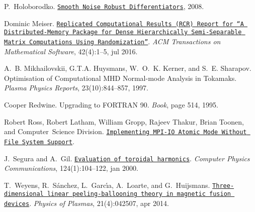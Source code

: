 \begin{DoxyDescription}
\item[\label{_CITEREF_holoborodko2008diff}%
\mbox{[}9\mbox{]}]P.~Holoborodko. \href{http://www.holoborodko.com/pavel/numerical-methods/numerical-derivative/smooth-low-noise-differentiators/}{\tt Smooth Noise Robust Differentiators}, 2008.


\item[\label{_CITEREF_Meiser2016}%
\mbox{[}10\mbox{]}]Dominic Meiser. \href{http://dl.acm.org/citation.cfm?doid=2956571.2929907}{\tt Replicated Computational Results (R\+CR) Report for “A Distributed-\/\+Memory Package for Dense Hierarchically Semi-\/\+Separable Matrix Computations Using Randomization”}. {\itshape A\+CM Transactions on Mathematical Software}, 42(4)\+:1--5, jul 2016. 


\item[\label{_CITEREF_mikhailovskii1997optimization}%
\mbox{[}11\mbox{]}]A.~B. Mikhailovskii, G.\+T.\+A. Huysmans, W.~O.~K. Kerner, and S.~E. Sharapov. Optimisation of Computational M\+HD Normal-\/mode Analysis in Tokamaks. {\itshape Plasma Physics Reports}, 23(10)\+:844--857, 1997.


\item[\label{_CITEREF_RedwineF90}%
\mbox{[}12\mbox{]}]Cooper Redwine. Upgrading to F\+O\+R\+T\+R\+AN 90. {\itshape Book}, page 514, 1995. 


\item[\label{_CITEREF_RossAtomicIO}%
\mbox{[}13\mbox{]}]Robert Ross, Robert Latham, William Gropp, Rajeev Thakur, Brian Toonen, and Computer~Science Division. \href{http://www.mcs.anl.gov/~thakur/papers/atomic-mode.pdf}{\tt Implementing M\+P\+I-\/\+IO Atomic Mode Without File System Support}.


\item[\label{_CITEREF_Segura2000}%
\mbox{[}14\mbox{]}]J.~Segura and A.~Gil. \href{http://linkinghub.elsevier.com/retrieve/pii/S0010465599004282
  https://ptp.jinr.ru/programs/cpc_ind8/ADKV.html
  http://cpc.cs.qub.ac.uk/summaries/ADKV_v1_0.html}{\tt Evaluation of toroidal harmonics}. {\itshape Computer Physics Communications}, 124(1)\+:104--122, jan 2000. 


\item[\label{_CITEREF_weyens2014theory}%
\mbox{[}15\mbox{]}]T.~Weyens, R.~S\'{a}nchez, L.~Garc\'{\i}a, A.~Loarte, and G.~Huijsmans. \href{http://aip.scitation.org/doi/10.1063/1.4871859}{\tt Three-\/dimensional linear peeling-\/ballooning theory in magnetic fusion devices}. {\itshape Physics of Plasmas}, 21(4)\+:042507, apr 2014. 



\end{DoxyDescription}
